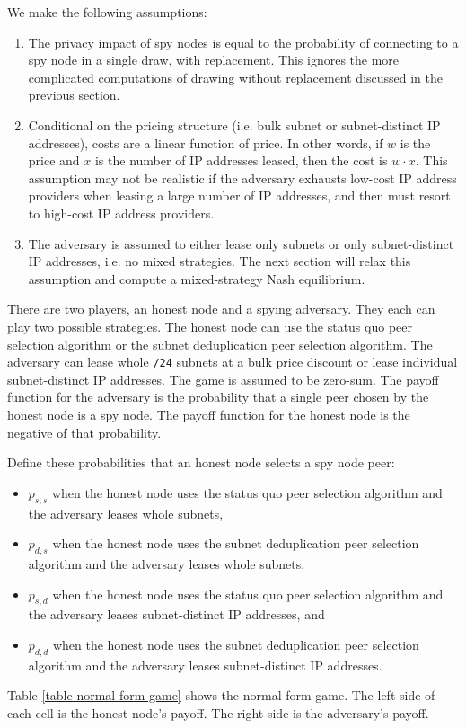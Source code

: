 \documentclass[english]{mrl}
\theoremstyle{plain}
\begin{document}
We make the following assumptions:
\begin{enumerate}
\item The privacy impact of spy nodes is equal to the probability of connecting
to a spy node in a single draw, with replacement. This ignores the
more complicated computations of drawing without replacement discussed
in the previous section.
\item Conditional on the pricing structure (i.e. bulk subnet or subnet-distinct
IP addresses), costs are a linear function of price. In other words,
if $w$ is the price and $x$ is the number of IP addresses leased,
then the cost is $w\cdot x$. This assumption may not be realistic
if the adversary exhausts low-cost IP address providers when leasing
a large number of IP addresses, and then must resort to high-cost
IP address providers.
\item The adversary is assumed to either lease only subnets or only subnet-distinct
IP addresses, i.e. no mixed strategies. The next section will relax
this assumption and compute a mixed-strategy Nash equilibrium.
\end{enumerate}
There are two players, an honest node and a spying adversary. They
each can play two possible strategies. The honest node can use the
status quo peer selection algorithm or the subnet deduplication peer
selection algorithm. The adversary can lease whole \texttt{/24} subnets
at a bulk price discount or lease individual subnet-distinct IP addresses.
The game is assumed to be zero-sum. The payoff function for the adversary
is the probability that a single peer chosen by the honest node is
a spy node. The payoff function for the honest node is the negative
of that probability.

Define these probabilities that an honest node selects a spy node
peer:
\begin{itemize}
\item $p_{s,s}$ when the honest node uses the status quo peer selection
algorithm and the adversary leases whole subnets,
\item $p_{d,s}$ when the honest node uses the subnet deduplication peer
selection algorithm and the adversary leases whole subnets,
\item $p_{s,d}$ when the honest node uses the status quo peer selection
algorithm and the adversary leases subnet-distinct IP addresses, and
\item $p_{d,d}$ when the honest node uses the subnet deduplication peer
selection algorithm and the adversary leases subnet-distinct IP addresses.
\end{itemize}
Table \ref{table-normal-form-game} shows the normal-form game. The
left side of each cell is the honest node's payoff. The right side
is the adversary's payoff.
\end{document}
